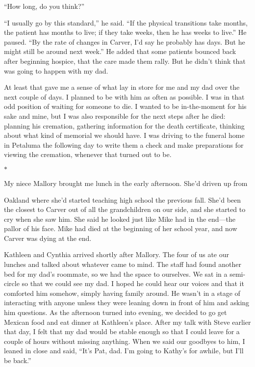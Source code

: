 \documentclass[12pt]{book}
\begin{document}
``How long, do you think?''

``I usually go by this standard,'' he said. ``If the physical transitions take months, the patient has months to live; if they take weeks, then he has weeks to live.'' He paused. ``By the rate of changes in Carver, I'd say he probably has days. But he might still be around next week.'' He added that some patients bounced back after beginning hospice, that the care made them rally. But he didn't think that was going to happen with my dad.

At least that gave me a sense of what lay in store for me and my dad over the next couple of days. I planned to be with him as often as possible. I was in that odd position of waiting for someone to die. I wanted to be in-the-moment for his sake and mine, but I was also responsible for the next steps after he died: planning his cremation, gathering information for the death certificate, thinking about what kind of memorial we should have. I was driving to the funeral home in Petaluma the following day to write them a check and make preparations for viewing the cremation, whenever that turned out to be.

\begin{center}$*$\end{center}

My niece Mallory brought me lunch in the early afternoon. She'd driven up from

Oakland where she'd started teaching high school the previous fall. She'd been the closest to Carver out of all the grandchildren on our side, and she started to cry when she saw him. She said he looked just like Mike had in the end---the pallor of his face. Mike had died at the beginning of her school year, and now Carver was dying at the end.

Kathleen and Cynthia arrived shortly after Mallory. The four of us ate our lunches and talked about whatever came to mind. The staff had found another bed for my dad's roommate, so we had the space to ourselves. We sat in a semi-circle so that we could see my dad. I hoped he could hear our voices and that it comforted him somehow, simply having family around. He wasn't in a stage of interacting with anyone unless they were leaning down in front of him and asking him questions. As the afternoon turned into evening, we decided to go get Mexican food and eat dinner at Kathleen's place. After my talk with Steve earlier that day, I felt that my dad would be stable enough so that I could leave for a couple of hours without missing anything. When we said our goodbyes to him, I leaned in close and said, ``It's Pat, dad. I'm going to Kathy's for awhile, but I'll be back.''
\end{document}
